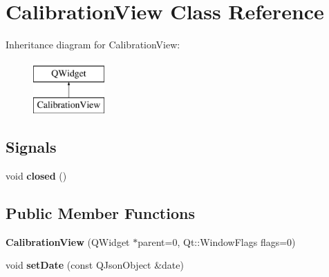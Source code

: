 \hypertarget{class_calibration_view}{\section{Calibration\-View Class Reference}
\label{class_calibration_view}
}
Inheritance diagram for Calibration\-View\-:\begin{figure}[H]
\begin{center}
\leavevmode
\includegraphics[height=2.000000cm]{class_calibration_view}
\end{center}
\end{figure}
\subsection*{Signals}
\begin{DoxyCompactItemize}
\item 
\hypertarget{class_calibration_view_a9ddb46423121e4c6bc09b6e4c256406c}{void {\bfseries closed} ()}\label{class_calibration_view_a9ddb46423121e4c6bc09b6e4c256406c}

\end{DoxyCompactItemize}
\subsection*{Public Member Functions}
\begin{DoxyCompactItemize}
\item 
\hypertarget{class_calibration_view_af753fef21eefeeae0449677135026bf2}{{\bfseries Calibration\-View} (Q\-Widget $\ast$parent=0, Qt\-::\-Window\-Flags flags=0)}\label{class_calibration_view_af753fef21eefeeae0449677135026bf2}

\item 
\hypertarget{class_calibration_view_ae92cb2d88f2ca736444e9a5e594f3b0c}{void {\bfseries set\-Date} (const Q\-Json\-Object \&date)}\label{class_calibration_view_ae92cb2d88f2ca736444e9a5e594f3b0c}

\end{DoxyCompactItemize}
